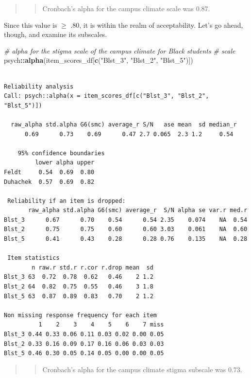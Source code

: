 \documentclass[
  11pt,
]{book}
\newenvironment{Shaded}{\begin{snugshade}}{\end{snugshade}}
\newcommand{\CommentTok}[1]{\textcolor[rgb]{0.37,0.37,0.37}{\textit{#1}}}
\newcommand{\FunctionTok}[1]{\textcolor[rgb]{0.27,0.27,0.27}{\textbf{#1}}}
\newcommand{\NormalTok}[1]{#1}
\newcommand{\SpecialCharTok}[1]{\textcolor[rgb]{0.43,0.43,0.43}{\textbf{#1}}}
\newcommand{\StringTok}[1]{\textcolor[rgb]{0.5,0.5,0.5}{#1}}
\begin{document}
\begin{quote}
\begin{quote}
Cronbach's alpha for the campus climate scale was 0.87.
\end{quote}
\end{quote}

Since this value is \(\geq\) .80, it is within the realm of acceptability. Let's go ahead, though, and examine its subscales.

\begin{Shaded}
\begin{Highlighting}[]
\CommentTok{\# alpha for the stigma scale of the campus climate for Black students}
\CommentTok{\# scale}
\NormalTok{psych}\SpecialCharTok{::}\FunctionTok{alpha}\NormalTok{(item\_scores\_df[}\FunctionTok{c}\NormalTok{(}\StringTok{"Blst\_3"}\NormalTok{, }\StringTok{"Blst\_2"}\NormalTok{, }\StringTok{"Blst\_5"}\NormalTok{)])}
\end{Highlighting}
\end{Shaded}

\begin{verbatim}

Reliability analysis   
Call: psych::alpha(x = item_scores_df[c("Blst_3", "Blst_2", "Blst_5")])

  raw_alpha std.alpha G6(smc) average_r S/N   ase mean  sd median_r
      0.69      0.73    0.69      0.47 2.7 0.065  2.3 1.2     0.54

    95% confidence boundaries 
         lower alpha upper
Feldt     0.54  0.69  0.80
Duhachek  0.57  0.69  0.82

 Reliability if an item is dropped:
       raw_alpha std.alpha G6(smc) average_r  S/N alpha se var.r med.r
Blst_3      0.67      0.70    0.54      0.54 2.35    0.074    NA  0.54
Blst_2      0.75      0.75    0.60      0.60 3.03    0.061    NA  0.60
Blst_5      0.41      0.43    0.28      0.28 0.76    0.135    NA  0.28

 Item statistics 
        n raw.r std.r r.cor r.drop mean  sd
Blst_3 63  0.72  0.78  0.62   0.46    2 1.2
Blst_2 64  0.82  0.75  0.55   0.46    3 1.8
Blst_5 63  0.87  0.89  0.83   0.70    2 1.2

Non missing response frequency for each item
          1    2    3    4    5    6    7 miss
Blst_3 0.44 0.33 0.06 0.11 0.03 0.02 0.00 0.05
Blst_2 0.33 0.16 0.09 0.17 0.16 0.06 0.03 0.03
Blst_5 0.46 0.30 0.05 0.14 0.05 0.00 0.00 0.05
\end{verbatim}

\begin{quote}
\begin{quote}
Cronbach's alpha for the campus climate stigma subscale was 0.73.
\end{quote}
\end{quote}
\end{document}
